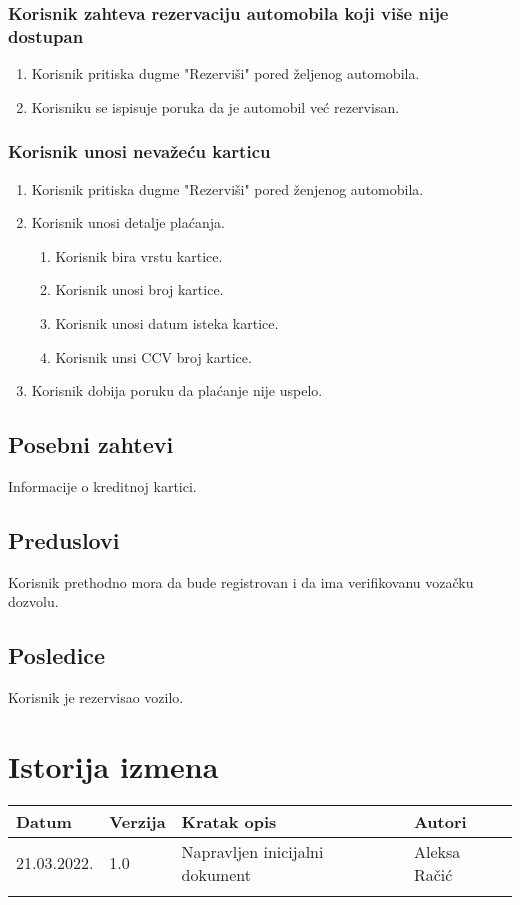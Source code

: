 \documentclass[12pt]{article}
\begin{document}
\subsubsection{Korisnik zahteva rezervaciju automobila koji više nije dostupan}
\begin{enumerate}
  \item Korisnik pritiska dugme "Rezerviši" pored željenog automobila.
  \item Korisniku se ispisuje poruka da je automobil već rezervisan.
\end{enumerate}

\subsubsection{Korisnik unosi nevažeću karticu}
\begin{enumerate}
\item Korisnik pritiska dugme "Rezerviši" pored ženjenog automobila.
  \item Korisnik unosi detalje plaćanja.
  \begin{enumerate}
    \item Korisnik bira vrstu kartice.
    \item Korisnik unosi broj kartice.
    \item Korisnik unosi datum isteka kartice.
    \item Korisnik unsi CCV broj kartice.
\end{enumerate}
  \item Korisnik dobija poruku da plaćanje nije uspelo.
\end{enumerate}

\subsection{Posebni zahtevi}
Informacije o kreditnoj kartici.
\subsection{Preduslovi}
Korisnik prethodno mora da bude registrovan i da ima verifikovanu vozačku dozvolu.
\subsection{Posledice}
Korisnik je rezervisao vozilo.

\section{Istorija izmena}
\begin{center}
\begin{tabular}{ | m{2cm} | m{1.5cm}| m{6cm} | m{5cm} | } 
\hline
Datum & Verzija & Kratak opis & Autori \\ 
\hline
 21.03.2022. & 1.0 & Napravljen inicijalni dokument & Aleksa Račić\\ 
\hline
&&&\\ 
\hline
\end{tabular}
\end{center}
\end{document}
